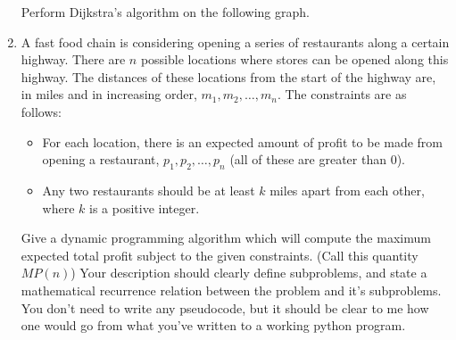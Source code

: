 \documentclass[12pt]{article}
\begin{document}
\begin{enumerate}
\begin{figure}[h]
    \end{figure}
    Perform Dijkstra's algorithm on the following graph. \label{dijkstra_prob}
    \newpage
    \item A fast food chain is considering opening a series of restaurants along a certain highway. There are $n$ possible locations where stores can be opened along this highway. The distances of these locations from the start of the highway are, in miles and in increasing order, $m_1, m_2, \ldots, m_n$. The constraints are as follows:
    \begin{itemize}
        \item For each location, there is an expected amount of profit to be made from opening a restaurant, $p_1, p_2, \ldots, p_n$ (all of these are greater than $0$).
        \item Any two restaurants should be at least $k$ miles apart from each other, where $k$ is a positive integer. 
    \end{itemize} 
    Give a dynamic programming algorithm which will compute the maximum expected total profit subject to the given constraints. (Call this quantity $MP(n)$) Your description should clearly define subproblems, and state a mathematical recurrence relation between the problem and it's subproblems. You don't need to write any pseudocode, but it should be clear to me how one would go from what you've written to a working python program. 
\end{enumerate}
\end{document}
